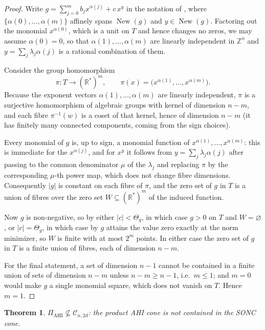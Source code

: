\documentclass[12pt]{elsarticle}
\newtheorem{theorem}{Theorem}[section]
\theoremstyle{definition}
\newcommand{\AHI}{\mathrm{AHI}}
\newcommand{\PiAHI}{\Pi_{\AHI}}
\newcommand{\SONC}{\mathcal{C}}
\begin{document}
\begin{proof}
Write $g=\sum_{j=0}^{m} b_j x^{\alpha(j)} + c\,x^{y}$ in the notation of \citep[Section~1]{iliman2016amoebas}, where $\{\alpha(0),\dots,\alpha(m)\}$ affinely spans $\operatorname{New}(g)$ and $y\in\operatorname{New}(g)$. Factoring out the monomial $x^{\alpha(0)}$, which is a unit on $T$ and hence changes no zeros, we may assume $\alpha(0)=0$, so that $\alpha(1),\dots,\alpha(m)$ are linearly independent in $\mathbb{Z}^{n}$ and $y=\sum_{j}\lambda_j\alpha(j)$ is a rational combination of them.
 
Consider the group homomorphism
\[
\pi: T \longrightarrow (\mathbb{R}^{*})^{m},
\qquad
\pi(x) = \big(x^{\alpha(1)},\dots,x^{\alpha(m)}\big).
\]
Because the exponent vectors $\alpha(1),\dots,\alpha(m)$ are linearly independent, $\pi$ is a surjective homomorphism of algebraic groups with kernel of dimension $n-m$, and each fibre $\pi^{-1}(w)$ is a coset of that kernel, hence of dimension $n-m$ (it has finitely many connected components, coming from the sign choices).
 
Every monomial of $g$ is, up to sign, a monomial function of $x^{\alpha(1)},\dots,x^{\alpha(m)}$: this is immediate for the $x^{\alpha(j)}$, and for $x^{y}$ it follows from $y=\sum_j\lambda_j\alpha(j)$ after passing to the common denominator $\mu$ of the $\lambda_j$ and replacing $\pi$ by the corresponding $\mu$-th power map, which does not change fibre dimensions. Consequently $|g|$ is constant on each fibre of $\pi$, and the zero set of $g$ in $T$ is a union of fibres over the zero set $W\subseteq(\mathbb{R}^{*})^{m}$ of the induced function.
 
Now $g$ is non-negative, so by \citep[Theorem~3.8]{iliman2016amoebas} either $|c|<\Theta_g$, in which case $g>0$ on $T$ and $W=\varnothing$, or $|c|=\Theta_g$, in which case by \citep[Proposition~3.4 and Corollary~3.9]{iliman2016amoebas} $g$ attains the value zero exactly at the norm minimizer, so $W$ is finite with at most $2^{m}$ points. In either case the zero set of $g$ in $T$ is a finite union of fibres, each of dimension $n-m$.
 
For the final statement, a set of dimension $n-1$ cannot be contained in a finite union of sets of dimension $n-m$ unless $n-m\ge n-1$, i.e.\ $m\le 1$; and $m=0$ would make $g$ a single monomial square, which does not vanish on $T$. Hence $m=1$.
\end{proof}
 
\begin{theorem}\label{thm:pi-not-sonc}
$\PiAHI \not\subseteq \SONC_{n,2d}$: the product AHI cone is not contained in the SONC cone.
\end{theorem}
 
\end{document}

